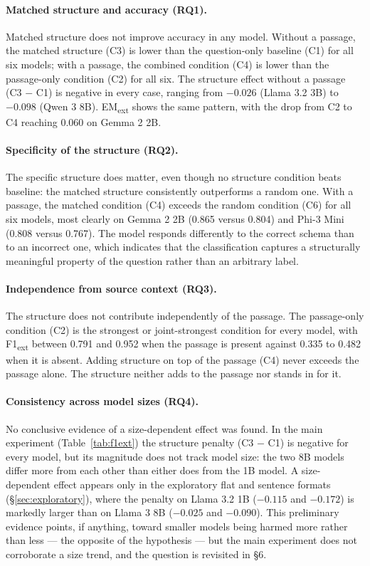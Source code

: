 \documentclass{article}
\begin{document}
\paragraph{Matched structure and accuracy (RQ1).}
Matched structure does not improve accuracy in any model. Without a passage, the matched structure (C3) is lower than the question-only baseline (C1) for all six models; with a passage, the combined condition (C4) is lower than the passage-only condition (C2) for all six. The structure effect without a passage (C3 $-$ C1) is negative in every case, ranging from $-0.026$ (Llama 3.2 3B) to $-0.098$ (Qwen 3 8B). EM\textsubscript{ext} shows the same pattern, with the drop from C2 to C4 reaching 0.060 on Gemma 2 2B.

\paragraph{Specificity of the structure (RQ2).}
The specific structure does matter, even though no structure condition beats baseline: the matched structure consistently outperforms a random one. With a passage, the matched condition (C4) exceeds the random condition (C6) for all six models, most clearly on Gemma 2 2B (0.865 versus 0.804) and Phi-3 Mini (0.808 versus 0.767). The model responds differently to the correct schema than to an incorrect one, which indicates that the classification captures a structurally meaningful property of the question rather than an arbitrary label.

\paragraph{Independence from source context (RQ3).}
The structure does not contribute independently of the passage. The passage-only condition (C2) is the strongest or joint-strongest condition for every model, with F1\textsubscript{ext} between 0.791 and 0.952 when the passage is present against 0.335 to 0.482 when it is absent. Adding structure on top of the passage (C4) never exceeds the passage alone. The structure neither adds to the passage nor stands in for it.

\paragraph{Consistency across model sizes (RQ4).}
No conclusive evidence of a size-dependent effect was found. In the main experiment (Table~\ref{tab:f1ext}) the structure penalty (C3 $-$ C1) is negative for every model, but its magnitude does not track model size: the two 8B models differ more from each other than either does from the 1B model. A size-dependent effect appears only in the exploratory flat and sentence formats (\S\ref{sec:exploratory}), where the penalty on Llama 3.2 1B ($-0.115$ and $-0.172$) is markedly larger than on Llama 3 8B ($-0.025$ and $-0.090$). This preliminary evidence points, if anything, toward smaller models being harmed more rather than less --- the opposite of the hypothesis --- but the main experiment does not corroborate a size trend, and the question is revisited in \S6.
\end{document}
